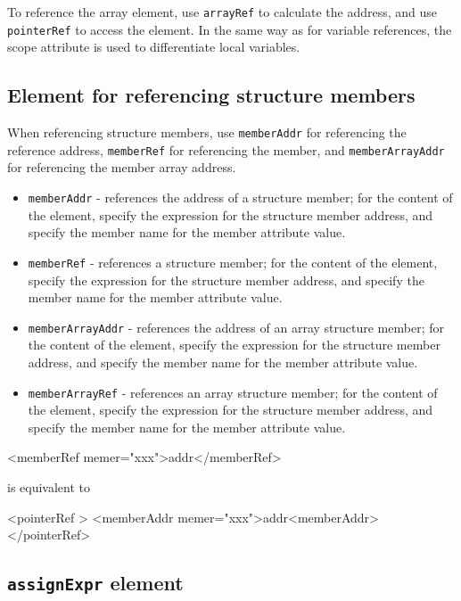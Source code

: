 To reference the array element, use {\tt arrayRef} to calculate the address, and use {\tt pointerRef} to access the element. 
In the same way as for variable references, the scope attribute is used to differentiate local variables.


\subsection{Element for referencing structure members}

When referencing structure members, use {\tt memberAddr} for referencing the reference address, {\tt memberRef} for referencing the member, and {\tt memberArrayAddr} for referencing the member array address. 

\begin{itemize}
\item {\tt memberAddr} - references the address of a structure member;
for the content of the element, specify the expression for the structure member address, and specify the member name for the member attribute value. 
\item {\tt memberRef} - references a structure member;
for the content of the element, specify the expression for the structure member address, and specify the member name for the member attribute value. 
\item {\tt memberArrayAddr} - references the address of an array structure member;
for the content of the element, specify the expression for the structure member address, and specify the member name for the member attribute value. 
\item {\tt memberArrayRef} - references an array structure member;
for the content of the element, specify the expression for the structure member address, and specify the member name for the member attribute value. 
\end{itemize}
\vspace{1mm}

\begin{XcodeMLExample}
<memberRef memer="xxx">addr</memberRef>
\end{XcodeMLExample}

is equivalent to
\vspace{2mm}

\begin{XcodeMLExample}
<pointerRef >
  <memberAddr memer="xxx">addr<memberAddr>
</pointerRef>
\end{XcodeMLExample}


\subsection{ {\tt assignExpr} element}


